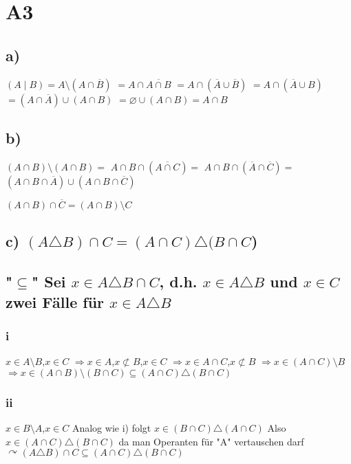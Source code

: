 \documentclass[11pt]{scrartcl}
\begin{document}
\section{A3}
\label{sec:A3}
\subsection{a)}
$(A \mid B)= A\setminus (A \cap \overline{B})$
$ = A\cap  \overline{A\cap B}$
$= A\cap (\overline{A} \cup \overline{B})$
$= A\cap (\overline{A} \cup B)$
$= (A \cap \overline{A}) \cup (A \cap B)$
$= \varnothing \cup (A \cap B)= A \cap B$

\subsection{b)}
$(A \cap B) \setminus (A \cap B)=$
$A \cap B \cap (\overline{A \cap C})=$
$A \cap B \cap (\overline{A} \cap \overline{C}) =$
$(A \cap B \cap \overline{A}) \cup (A \cap B \cap \overline{C})$
\begin{flushleft}
$(A \cap B) \cap \overline{C} = (A \cap B) \setminus C$
\end{flushleft}

\subsection{c) $(A \triangle B) \cap C = (A \cap C) \triangle (B \cap C$)}

\subsection*{"$\subseteq$"  Sei $x \in A \triangle B \cap C$, d.h. $x \in A \triangle B$ und $x \in C$ zwei Fälle für $x \in A \triangle B$}


\subsubsection{i}
$x \in A \setminus B$,$x \in C$
$\Rightarrow x \in A$,$x \not\subset B$,$x \in C$
$\Rightarrow x \in A \cap C$,$x \not\subset B$
$\Rightarrow x \in (A \cap C) \setminus B$
$\Rightarrow x \in (A \cap B) \setminus (B \cap C) \subseteq (A \cap C) \triangle (B \cap C)$

\subsubsection{ii}
$x \in B \setminus A$,$x \in C$ Analog wie i) folgt $x \in (B \cap C) \triangle (A \cap C)$ Also $x \in (A \cap C) \triangle (B \cap C)$ da man Operanten für "A" vertauschen darf
$\curvearrowright (A \triangle B) \cap C \subseteq (A \cap C) \triangle (B \cap C)$
\end{document}
